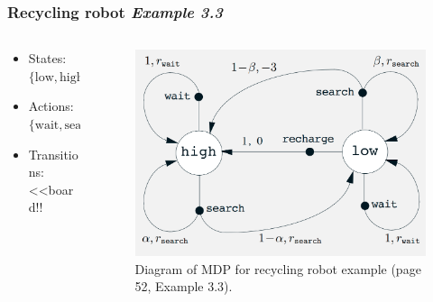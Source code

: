 \documentclass{beamer}
\begin{document}
\begin{frame}
  \frametitle{Recycling robot {\em Example 3.3} \cite{Sutton2018}}
  \begin{columns}[T]
    \begin{column}{.5\textwidth}
      \begin{itemize}
      \item States: $\{\text{low},\text{high}\}$
      \item Actions: $\{\text{wait}, \text{search}, \text{recharge}\}$
      \item Transitions: <<board!!
      \end{itemize}
    \end{column}
    \begin{column}{.5\textwidth}
      \begin{figure}
        \label{fig:recycle-robot-mdp}
        \includegraphics[width=\textwidth]{../images/sutton2018_recycle_robot.png}
        \caption{Diagram of MDP for \cite{Sutton2018} recycling robot example
          (page 52, Example 3.3).}
      \end{figure}
    \end{column}
  \end{columns}
\end{frame}
\end{document}
